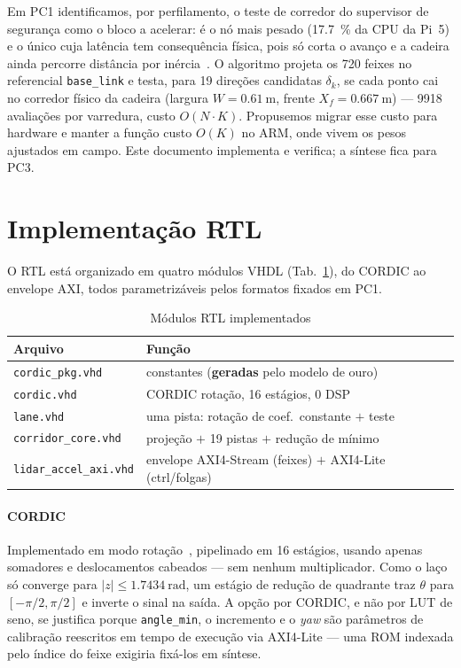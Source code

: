 \documentclass[conference]{IEEEtran}
\begin{document}
Em PC1 identificamos, por perfilamento, o teste de corredor do supervisor de
seguran\c{c}a como o bloco a acelerar: \'e o n\'o mais pesado
(\SI{17.7}{\percent} da CPU da Pi~5) e o \'unico cuja lat\^encia tem
consequ\^encia f\'isica, pois s\'o corta o avan\c{c}o e a cadeira ainda percorre
dist\^ancia por in\'ercia~\cite{fehr2000}. O algoritmo projeta os \num{720}
feixes no referencial \texttt{base\_link} e testa, para \num{19} dire\c{c}\~oes
candidatas $\delta_k$, se cada ponto cai no corredor f\'isico da cadeira
(largura $W=\SI{0.61}{\metre}$, frente $X_f=\SI{0.667}{\metre}$) --- \num{9918}
avalia\c{c}\~oes por varredura, custo $O(N\cdot K)$. Propusemos migrar esse custo
para hardware e manter a fun\c{c}\~ao custo $O(K)$ no ARM, onde vivem os pesos
ajustados em campo. Este documento implementa e verifica; a s\'intese fica para
PC3.

\section{Implementa\c{c}\~ao RTL}

O RTL est\'a organizado em quatro m\'odulos VHDL (Tab.~\ref{tab:rtl}), do CORDIC
ao envelope AXI, todos parametriz\'aveis pelos formatos fixados em PC1.

\begin{table}[!t]
\caption{M\'odulos RTL implementados}
\label{tab:rtl}
\centering\footnotesize
\begin{tabular}{@{}ll@{}}
\toprule
\textbf{Arquivo} & \textbf{Fun\c{c}\~ao} \\
\midrule
\texttt{cordic\_pkg.vhd}   & constantes (\textbf{geradas} pelo modelo de ouro) \\
\texttt{cordic.vhd}        & CORDIC rota\c{c}\~ao, \num{16} est\'agios, \num{0} DSP \\
\texttt{lane.vhd}          & uma pista: rota\c{c}\~ao de coef.\ constante $+$ teste \\
\texttt{corridor\_core.vhd}& proje\c{c}\~ao $+$ \num{19} pistas $+$ redu\c{c}\~ao de m\'inimo \\
\texttt{lidar\_accel\_axi.vhd} & envelope AXI4-Stream (feixes) $+$ AXI4-Lite (ctrl/folgas) \\
\bottomrule
\end{tabular}
\end{table}

\paragraph{CORDIC}
Implementado em modo rota\c{c}\~ao~\cite{volder1959}, pipelinado em \num{16}
est\'agios, usando apenas somadores e deslocamentos cabeados --- sem nenhum
multiplicador. Como o la\c{c}o s\'o converge para $|z|\le\SI{1.7434}{\radian}$, um
est\'agio de redu\c{c}\~ao de quadrante traz $\theta$ para $[-\pi/2,\pi/2]$ e
inverte o sinal na sa\'ida. A op\c{c}\~ao por CORDIC, e n\~ao por LUT de seno, se
justifica porque \texttt{angle\_min}, o incremento e o \emph{yaw} s\~ao
par\^ametros de calibra\c{c}\~ao reescritos em tempo de execu\c{c}\~ao via
AXI4-Lite --- uma ROM indexada pelo \'indice do feixe exigiria fix\'a-los em
s\'intese.
\end{document}
